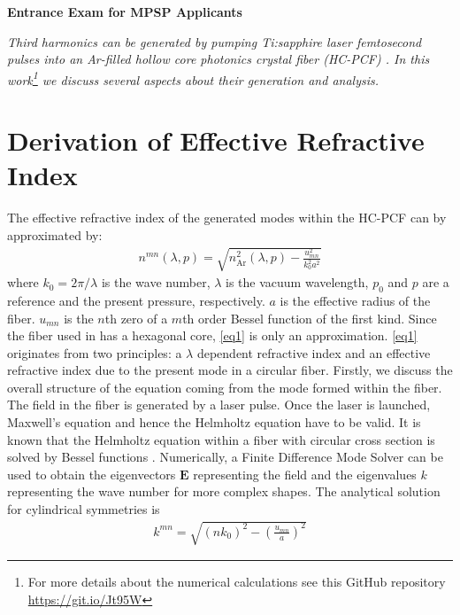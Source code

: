 \documentclass[fleqn, 10pt, twocolumn]{SelfArx}
\begin{document}
%
\begin{center}
\colorbox{color2!10}{\large{}\textcolor{color1}{\sffamily\bfseries Entrance Exam for MPSP Applicants}}
\end{center}
    \textit{Third harmonics can be generated by pumping Ti:sapphire laser femtosecond pulses into an Ar-filled hollow core photonics crystal fiber (HC-PCF) \cite{Nold2010}. 
        In this work\footnote{For more details about the numerical calculations see this GitHub repository \url{https://git.io/Jt95W}} we discuss several aspects about their generation and analysis.}

    \section{Derivation of Effective Refractive Index}
    The effective refractive index of the generated modes within the HC-PCF can by approximated by:
    \begin{align}
        n^{mn}(\lambda, p) = \sqrt{n^2_{\text{Ar}}(\lambda, p ) - \frac{u_{mn}^2}{k_0^2 a^2}} 
        \label{eq1}
    \end{align}
    where $k_0=2\pi/\lambda$ is the wave number, $\lambda$ is the vacuum wavelength, $p_0$ and $p$ are a reference and the present pressure, respectively. $a$ is the 
    effective radius of the fiber. $u_{mn}$ is the $n$th zero of a $m$th order Bessel function of the first kind. Since the fiber used in \cite{Nold2010} has a hexagonal core, \eqref{eq1} is only an approximation.
    \eqref{eq1} originates from two principles: a $\lambda$ dependent refractive index and an effective refractive index due to the present mode in a circular fiber.
    Firstly, we discuss the overall structure of the equation coming from the mode formed within the fiber. The field in the fiber is generated by a laser pulse. Once the laser is launched, Maxwell's equation and hence the Helmholtz equation have to be valid.
    It is known that the Helmholtz equation within a fiber with circular cross section is solved by Bessel functions \cite{Nickelson2019}. 
    Numerically, a Finite Difference Mode Solver can be used to obtain the eigenvectors $\mathbf E$ representing the field and the eigenvalues $k$ representing the wave number for more complex shapes. The analytical solution for cylindrical symmetries is 
    \begin{align}
        k^{mn} = \sqrt{(n k_0)^2 - \left( \frac{u_{mn}}{a}\right)^2}
    \end{align}
\end{document}
